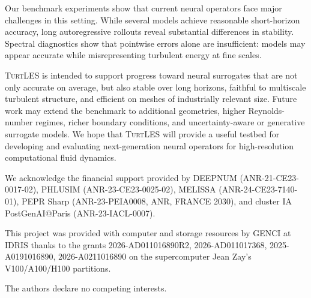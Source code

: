 \documentclass{article}
\begin{document}
Our benchmark experiments show that current neural operators face major challenges in this setting. While several models achieve reasonable short-horizon accuracy, long autoregressive rollouts reveal substantial differences in stability. Spectral diagnostics show that pointwise errors alone are insufficient: models may appear accurate while misrepresenting turbulent energy at fine scales. 

\textsc{TurtLES} is intended to support progress toward neural surrogates that are not only accurate on average, but also stable over long horizons, faithful to multiscale turbulent structure, and efficient on \textcolor{revcolor}{meshes of industrially relevant size}. Future work may extend the benchmark to additional geometries, higher Reynolds-number regimes, richer boundary conditions, and uncertainty-aware or generative surrogate models. We hope that \textsc{TurtLES} will provide a useful testbed for developing and evaluating next-generation neural operators for high-resolution computational fluid dynamics.

\begin{ack}
We acknowledge the financial support provided by DEEPNUM (ANR-21-CE23-0017-02), PHLUSIM (ANR-23-CE23-0025-02), MELISSA (ANR-24-CE23-7140-01), PEPR Sharp (ANR-23-PEIA0008, ANR, FRANCE 2030), and  cluster IA  PostGenAI@Paris (ANR-23-IACL-0007).

This project was provided with computer and storage resources
by GENCI at IDRIS thanks to the grants 2026-AD011016890R2, 2026-AD011017368, 2025-A0191016890, 2026-A0211016890 on the supercomputer Jean Zay’s V100/A100/H100 partitions.

The authors declare no competing interests.
\end{ack}

\clearpage



\clearpage
\appendix

\end{document}
